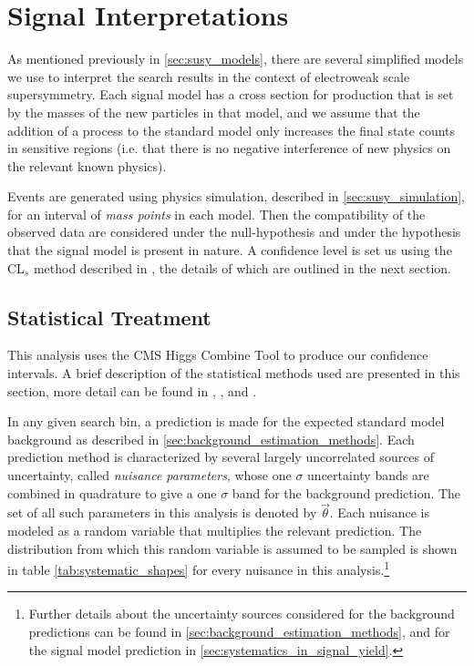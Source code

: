 \section{Signal Interpretations} 

  As mentioned previously in \ref{sec:susy_models}, there are several simplified models we use to interpret the search results in the context of electroweak scale supersymmetry. Each signal model has a cross section for production that is set by the masses of the new particles in that model, and we assume that the addition of a process to the standard model only increases the final state counts in sensitive regions (i.e. that there is no negative interference of new physics on the relevant known physics). 

  Events are generated using physics simulation, described in \ref{sec:susy_simulation}, for an interval of \emph{mass points} in each model. Then the compatibility of the observed data are considered under the null-hypothesis and under the hypothesis that the signal model is present in nature. A confidence level is set us using the CL$_s$ method described in \cite{CLS_method}, the details of which are outlined in the next section.

  \subsection{Statistical Treatment}
    This analysis uses the CMS Higgs Combine Tool \cite{higgs_combine} to produce our confidence intervals. A brief description of the statistical methods used are presented in this section, more detail can be found in \cite{higgs_combine}, \cite{Likelihood_Cowen_Cranmer}, and \cite{CLS_method}. 

    In any given search bin, a prediction is made for the expected standard model background as described in \ref{sec:background_estimation_methods}. Each prediction method is characterized by several largely uncorrelated sources of uncertainty, called \emph{nuisance parameters}, whose one $\sigma$ uncertainty bands are combined in quadrature to give a one $\sigma$ band for the background prediction. The set of all such parameters in this analysis is denoted by $\vec{\theta}$. Each nuisance is modeled as a random variable that multiplies the relevant prediction. The distribution from which this random variable is assumed to be sampled is shown in table \ref{tab:systematic_shapes} for every nuisance in this analysis.\footnote{Further details about the uncertainty sources considered for the background predictions can be found in \ref{sec:background_estimation_methods}, and for the signal model prediction in \ref{sec:systematics_in_signal_yield}.}

